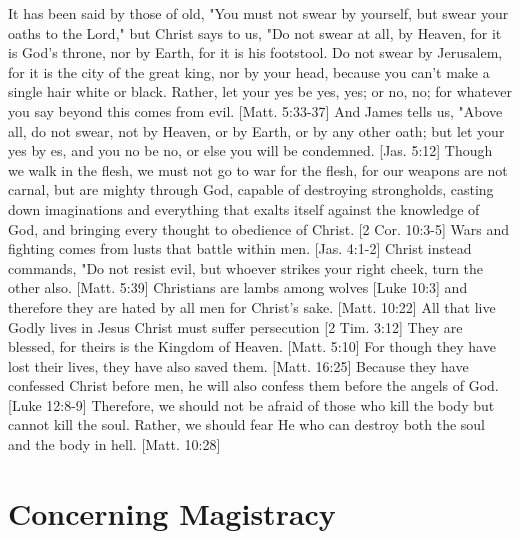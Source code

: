 \documentclass[../main.tex] {subfiles}
\begin{document}
	It has been said by those of old, "You must not swear by yourself, but swear your oaths to the Lord," but Christ says to us, "Do not swear at all, by Heaven, for it is God's throne, nor by Earth, for it is his footstool. Do not swear by Jerusalem, for it is the city of the great king, nor by your head, because you can't make a single hair white or black. Rather, let your yes be yes, yes; or no, no; for whatever you say beyond this comes from evil. [Matt. 5:33-37]  And James tells us, "Above all, do not swear, not by Heaven, or by Earth, or by any other oath; but let your yes by es, and you no be no, or else you will be condemned. [Jas. 5:12]  Though we walk in the flesh, we must not go to war for the flesh, for our weapons are not carnal, but are mighty through God, capable of destroying strongholds, casting down imaginations and everything that exalts itself against the knowledge of God, and bringing every thought to obedience of Christ. [2 Cor. 10:3-5]  Wars and fighting comes from lusts that battle within men. [Jas. 4:1-2]  Christ instead commands, "Do not resist evil, but whoever strikes your right cheek, turn the other also. [Matt. 5:39]  Christians are lambs among wolves [Luke 10:3]  and therefore they are hated by all men for Christ's sake. [Matt. 10:22]  All that live Godly lives in Jesus Christ must suffer persecution [2 Tim. 3:12]  They are blessed, for theirs is the Kingdom of Heaven. [Matt. 5:10]  For though they have lost their lives, they have also saved them. [Matt. 16:25]  Because they have confessed Christ before men, he will also confess them before the angels of God. [Luke 12:8-9]  Therefore, we should not be afraid of those who kill the body but cannot kill the soul. Rather, we should fear He who can destroy both the soul and the body in hell. [Matt. 10:28] 

	\section{Concerning Magistracy}
\end{document}

